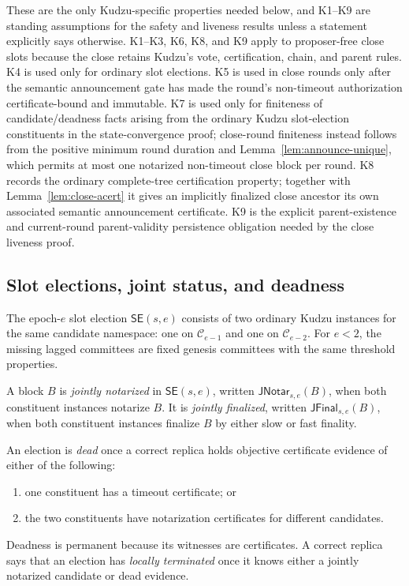 \documentclass[11pt]{article}
\theoremstyle{definition}
\theoremstyle{remark}
\newcommand{\C}{\mathcal C}
\newcommand{\SE}{\mathsf{SE}}
\newcommand{\JNotar}{\mathsf{JNotar}}
\newcommand{\JFinal}{\mathsf{JFinal}}
\begin{document}
These are the only Kudzu-specific properties needed below, and K1--K9 are standing assumptions for the safety and liveness results unless a statement explicitly says otherwise. K1--K3, K6, K8, and K9 apply to proposer-free close slots because the close retains Kudzu's vote, certification, chain, and parent rules. K4 is used only for ordinary slot elections. K5 is used in close rounds only after the semantic announcement gate has made the round's non-timeout authorization certificate-bound and immutable. K7 is used only for finiteness of candidate/deadness facts arising from the ordinary Kudzu slot-election constituents in the state-convergence proof; close-round finiteness instead follows from the positive minimum round duration and Lemma~\ref{lem:announce-unique}, which permits at most one notarized non-timeout close block per round. K8 records the ordinary complete-tree certification property; together with Lemma~\ref{lem:close-acert} it gives an implicitly finalized close ancestor its own associated semantic announcement certificate. K9 is the explicit parent-existence and current-round parent-validity persistence obligation needed by the close liveness proof.

\subsection{Slot elections, joint status, and deadness}

The epoch-$e$ slot election $\SE(s,e)$ consists of two ordinary Kudzu instances for the same candidate namespace: one on $\C_{e-1}$ and one on $\C_{e-2}$. For $e<2$, the missing lagged committees are fixed genesis committees with the same threshold properties.

A block $B$ is \emph{jointly notarized} in $\SE(s,e)$, written $\JNotar_{s,e}(B)$, when both constituent instances notarize $B$. It is \emph{jointly finalized}, written $\JFinal_{s,e}(B)$, when both constituent instances finalize $B$ by either slow or fast finality.

An election is \emph{dead} once a correct replica holds objective certificate evidence of either of the following:
\begin{enumerate}[label=(\alph*),nosep]
  \item one constituent has a timeout certificate; or
  \item the two constituents have notarization certificates for different candidates.
\end{enumerate}
Deadness is permanent because its witnesses are certificates. A correct replica says that an election has \emph{locally terminated} once it knows either a jointly notarized candidate or dead evidence.
\end{document}
